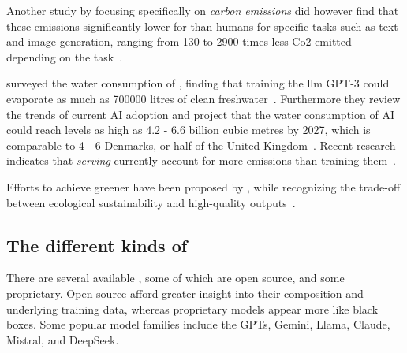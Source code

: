 Another study by \citeauthor{llmCarbon} focusing specifically on \textit{carbon emissions} did
however find that these emissions significantly lower for  than humans for specific
tasks such as text and image generation, ranging from \num{130} to \num{2900} times less Co2 emitted
depending on the task~\cite[1]{llmCarbon}.

\citeauthor{thirstyLlm} surveyed the water consumption of , finding that training the
\acrshort{llm} \textsc{GPT-3} could evaporate as much as \num{700000} litres of clean
freshwater~\cite[1]{thirstyLlm}. Furthermore they review the trends of current AI adoption and
project that the water consumption of AI could reach levels as high as \num{4.2} - \num{6.6} billion
cubic metres by \num{2027}, which is comparable to \num{4} - \num{6} Denmarks, or half of the United
Kingdom~\cite[1]{thirstyLlm}. Recent research indicates that \textit{serving} 
currently account for more emissions than training them~\cite[37]{sustainableLlmServing}.

Efforts to achieve greener  have been proposed by \citeauthor{sproutGreenLlm}, while
recognizing the trade-off between ecological sustainability and high-quality
outputs~\cite[21799]{sproutGreenLlm}.




\subsection{The different kinds of }\label{sec:llmJungle}

There are several available , some of which are open source, and some proprietary.
Open source  afford greater insight into their composition and underlying training
data, whereas proprietary models appear more like black boxes. Some popular model families include
the GPTs, Gemini, Llama, Claude, Mistral, and DeepSeek.

